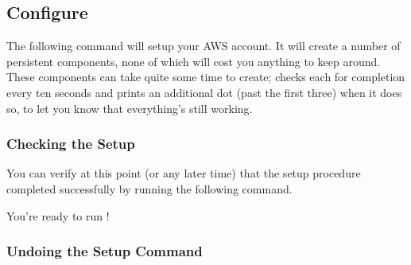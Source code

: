 \subsection{Configure }

The following command will setup your AWS account.  It will create a number
of persistent components, none of which will cost you anything to keep around.
These components can take quite some time to create;  checks
each for completion every ten seconds and prints an additional dot (past the
first three) when it does so, to let you know that everything's still working.


\subsubsection{Checking the Setup}
\label{sec:Checking the Setup}

You can verify at this point (or any later time) that the setup procedure
completed successfully by running the following command.


You're ready to run !

\subsubsection{Undoing the Setup Command}

